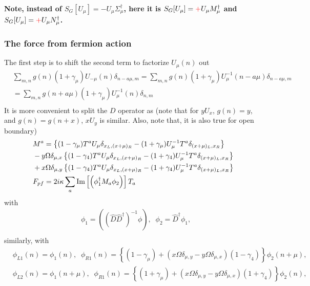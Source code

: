 \textbf{Note, instead of $S_G[U_{\mu}]=-U_{\mu} \Sigma ^{\dagger}_{\mu}$, here it is $S_G[U_{\mu}]=\textcolor[rgb]{1,0,0}{+}U_{\mu} M^{\dagger} _{\mu}$ and $S_G[U_{\mu}]=\textcolor[rgb]{1,0,0}{+}U_{\mu} N^{\dagger} _{\mu}$.}

\subsubsection{\label{sec:TheForceFromFermionAction}The force from fermion action}

The first step is to shift the second term to factorize $U_{\mu}(n)$ out
\begin{equation}
\begin{split}
&\sum _{m,n}g(n)(1+\gamma _{\mu})U_{-\mu}(n)\delta _{n-a\mu,m}=\sum _{m,n}g(n)(1+\gamma _{\mu})U_{\mu}^{-1}(n-a\mu)\delta _{n-a\mu,m}\\
&=\sum _{m,n}g(n+a\mu)(1+\gamma _{\mu})U_{\mu}^{-1}(n)\delta _{n,m}\\
\end{split}
\end{equation}
It is more convenient to split the $D$ operator as (note that for $yU_x$, $g(n)=y$, and $g(n)=g(n+x)$, $xU_y$ is similar. Also, note that, it is also true for open boundary)
\begin{equation}
\begin{split}
&M^a=\left\{(1-\gamma _{\mu})T^aU_{\mu}\delta _{x_L,(x+\mu)_R}-(1+\gamma _{\mu})U_{\mu}^{-1}T^a\delta _{(x+\mu)_L,x_R}\right\}\\
&-y\Omega\delta _{\mu,x}\left\{(1-\gamma _4)T^aU_{\mu}\delta _{x_L,(x+\mu)_R}-(1+\gamma _4)U_{\mu}^{-1}T^a\delta _{(x+\mu)_L,x_R}\right\}\\
&+x\Omega\delta _{\mu,y}\left\{(1-\gamma _4)T^aU_{\mu}\delta _{x_L,(x+\mu)_R}-(1+\gamma _4)U_{\mu}^{-1}T^a\delta _{(x+\mu)_L,x_R}\right\}\\
&F_{pf}=2i\kappa \sum _a {\rm Im}\left[\left(\phi _1 ^{\dagger} M_a \phi _2\right)\right] T_a\\
\end{split}
\end{equation}
with
\begin{equation}
\begin{split}
&\phi _1=\left(\left(\hat{D}\hat{D}^{\dagger}\right)^{-1}\phi\right),\;\;\phi _2=\hat{D}^{\dagger}\phi _1,\\
\end{split}
\end{equation}
similarly, with
\begin{equation}
\begin{split}
&\phi_{L1}(n)=\phi _1(n),\;\;\phi _{R1}(n)=\left\{(1-\gamma _{\mu})+\left(x\Omega \delta _{\mu,y}-y\Omega \delta_{\mu,x}\right)(1-\gamma _4)\right\}\phi _2(n+\mu),\\
&\phi_{L2}(n)=\phi _1(n+\mu),\;\;\phi _{R1}(n)=\left\{(1+\gamma _{\mu})+\left(x\Omega \delta _{\mu,y}-y\Omega \delta_{\mu,x}\right)(1+\gamma _4)\right\}\phi _2(n),\\
\end{split}
\end{equation}
